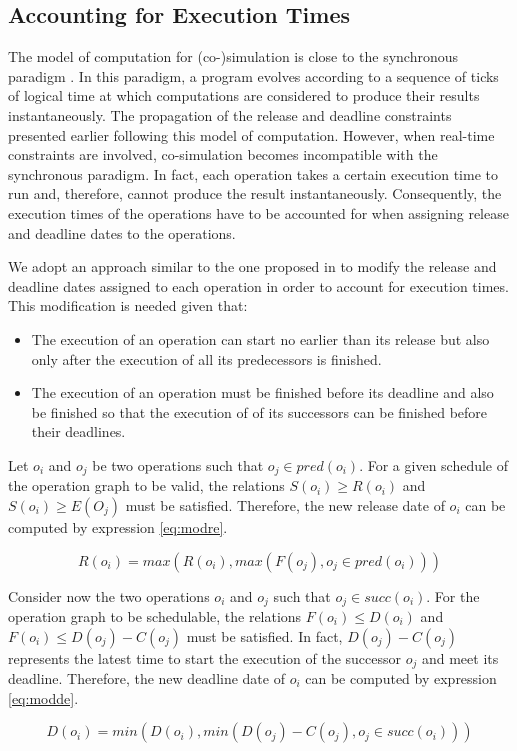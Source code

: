 \subsection{Accounting for Execution Times}

The model of computation for (co-)simulation is close to the synchronous paradigm \cite{benveniste:1991synchronous,benveniste:2003}. In this paradigm, a program evolves according to a sequence of ticks of logical time at which computations are considered to produce their results instantaneously. The propagation of the release and deadline constraints presented earlier following this model of computation. However, when real-time constraints are involved, co-simulation becomes incompatible with the synchronous paradigm. In fact, each operation takes a certain execution time to run and, therefore, cannot produce the result instantaneously. Consequently, the execution times of the operations have to be accounted for when assigning release and deadline dates to the operations.

We adopt an approach similar to the one proposed in \cite{chetto:1990} to modify the release and deadline dates assigned to each operation in order to account for execution times. This modification is needed given that:

\begin{itemize}

\item The execution of an operation can start no earlier than its release but also only after the execution of all its predecessors is finished.

\item The execution of an operation must be finished before its deadline and also be finished so that the execution of of its successors can be finished before their deadlines.

\end{itemize}

Let $o_i$ and $o_j$ be two operations such that $o_j \in pred(o_i)$. For a given schedule of the operation graph to be valid, the relations $S(o_i) \geq R(o_i)$ and $S(o_i) \geq E(O_j)$ must be satisfied. Therefore, the new release date of $o_i$ can be computed by expression \ref{eq:modre}.

\begin{equation} 
R(o_i) = max(R(o_i), max(F(o_j), o_j \in pred(o_i)))
\label{eq:modre}
\end{equation}

Consider now the two operations $o_i$ and $o_j$ such that $o_j \in succ(o_i)$. For the operation graph to be schedulable, the relations $F(o_i) \leq D(o_i)$ and $F(o_i) \leq D(o_j) - C(o_j)$ must be satisfied. In fact, $D(o_j) - C(o_j)$ represents the latest time to start the execution of the successor $o_j$ and meet its deadline. Therefore, the new deadline date of $o_i$ can be computed by expression \ref{eq:modde}.

\begin{equation} 
D(o_i) = min(D(o_i), min(D(o_j) - C(o_j), o_j \in succ(o_i)))
\label{eq:modde}
\end{equation}   
